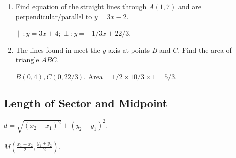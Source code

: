 \documentclass[8pt]{article}
\begin{document}
			\prob

			\begin{enumerate}[label = \probword{(\arabic*)}]
				\item Find equation of the straight lines through \(A (1, 7)\) and are perpendicular/parallel to \(y = 3x - 2\).
				
				\solution \(\parallel: y = 3x + 4; \perp: y = -1/3 x + 22/3\).

				\item The lines found in  meet the \(y\)-axis at points \(B\) and \(C\). Find the area of triangle \(ABC\).
				
				\solution \(B(0, 4), C(0, 22/3)\). \(\text{Area} = 1/2 \times 10/3 \times 1 = 5 / 3\).
			\end{enumerate}

		\subsection{Length of Sector and Midpoint}
			\defi {} \(d = \sqrt{(x_2 - x_1)^2} + (y_2 - y_1)^2\).

			\defi {} \(\displaystyle M \left(\frac{x_1 + x_2}{2}, \frac{y_1 + y_2}{2}\right)\).
\end{document}
